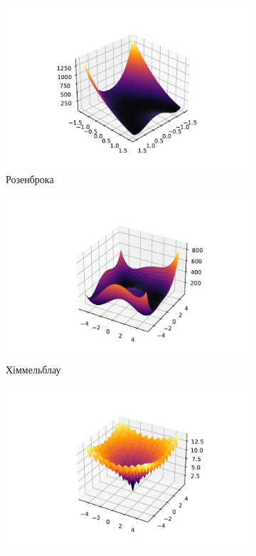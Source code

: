 \begin{figure}[h!]
    \begin{subfigure}{0.3 \textwidth}
        \includegraphics[width=1.5\textwidth,scale=3, trim=3.5cm 0 0 0]{assets/rosenbrock.pdf}
        \caption{Розенброка}
    \end{subfigure}
    \begin{subfigure}{0.3 \textwidth}
        \includegraphics[width=1.45\textwidth, scale=3, trim=3.5cm 0 0 0]{assets/himmelblau.pdf}
        \caption{Хіммельблау}
    \end{subfigure}
    \begin{subfigure}{0.3 \textwidth}
        \includegraphics[width=1.5\textwidth, scale=3, trim=3.5cm 0 0 0]{assets/ackley.pdf}

\end{subfigure}
\end{figure}
